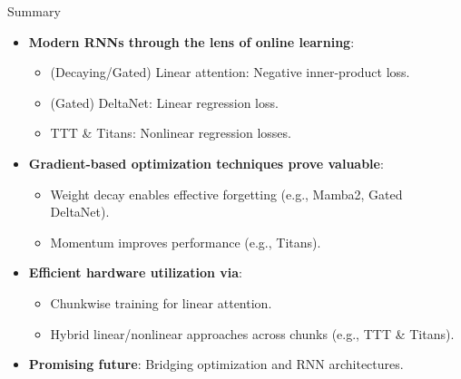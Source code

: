   \begin{frame}{Summary}
    \begin{itemize}
        \item \textbf{Modern RNNs through the lens of online learning}:
            \begin{itemize}
                \item (Decaying/Gated) Linear attention: Negative inner-product loss.
                \item (Gated) DeltaNet: Linear regression loss.
                \item TTT \& Titans: Nonlinear regression losses.
            \end{itemize}
        
        \item \textbf{Gradient-based optimization techniques prove valuable}:
            \begin{itemize}
                \item Weight decay enables effective forgetting (e.g., Mamba2, Gated DeltaNet).
                \item Momentum improves performance (e.g., Titans).
            \end{itemize}
        
        \item \textbf{Efficient hardware utilization via}:
            \begin{itemize}
                \item Chunkwise training for linear attention.
                \item Hybrid linear/nonlinear approaches across chunks (e.g., TTT \& Titans).
            \end{itemize}
        
        \item \textbf{Promising future}: Bridging optimization and RNN architectures.
    \end{itemize}
\end{frame}